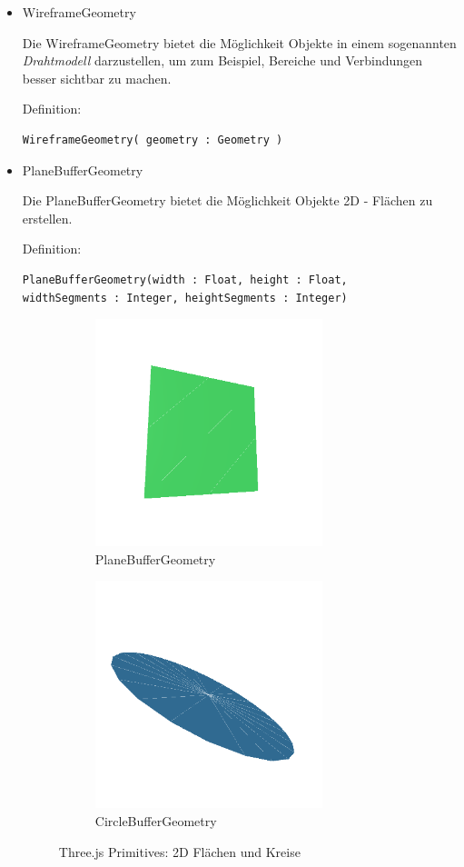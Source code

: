 \begin{itemize}
\item WireframeGeometry 
  
Die WireframeGeometry bietet die Möglichkeit Objekte in einem sogenannten \textit{Drahtmodell} darzustellen, um zum Beispiel, Bereiche und Verbindungen besser sichtbar zu machen.

Definition:
\begin{lstlisting}
WireframeGeometry( geometry : Geometry )
\end{lstlisting}

\item PlaneBufferGeometry 
  
Die PlaneBufferGeometry bietet die Möglichkeit Objekte 2D - Flächen zu erstellen.

Definition:
\begin{lstlisting}
PlaneBufferGeometry(width : Float, height : Float,
widthSegments : Integer, heightSegments : Integer)
\end{lstlisting}
\newpage
\begin{figure}[h]
    \begin{subfigure}{0.5\textwidth}
    \centering
    \includegraphics[width=0.5\linewidth]{images/plane.png} 
    \caption{PlaneBufferGeometry}
    \label{fig:subim1}
    \end{subfigure}
    \begin{subfigure}{0.5\textwidth}
    \centering
    \includegraphics[width=0.5\linewidth]{images/circle.png}
    \caption{CircleBufferGeometry}
    \label{fig:subim2}
    \end{subfigure}
\caption{Three.js Primitives: 2D Flächen und Kreise \cite{geometry_types}}
\label{fig:image2}
\end{figure}


\end{itemize}
